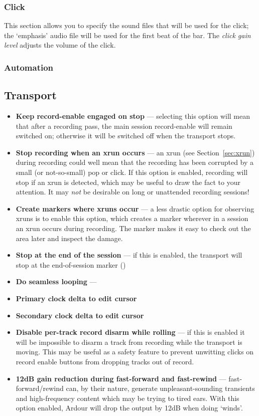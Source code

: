 \documentclass[10pt,a4paper]{book}
\newcommand{\todo}[1]{\marginpar{\small\texttt{#1}}}
\begin{document}
{\subsubsection{Click}

This section allows you to specify the sound files that will be used
for the click; the `emphasis' audio file will be used for the first
beat of the bar.  The \emph{click gain level} adjusts the volume of
the click.

\subsubsection{Automation}


\subsection{Transport}

\begin{itemize}
\item \textbf{Keep record-enable engaged on stop} --- selecting this
  option will mean that after a recording pass, the main session
  record-enable will remain switched on; otherwise it will be switched
  off when the transport stops.
\item \textbf{Stop recording when an xrun occurs} --- an xrun (see
  Section~\ref{sec:xrun}) during recording could well mean that the
  recording has been corrupted by a small (or not-so-small) pop or
  click.  If this option is enabled, recording will stop if an xrun is
  detected, which may be useful to draw the fact to your attention.
  It may \emph{not} be desirable on long or unattended recording
  sessions!
\item \textbf{Create markers where xruns occur} --- a less drastic
  option for observing xruns is to enable this option, which creates a
  marker wherever in a session an xrun occurs during recording.  The
  marker makes it easy to check out the area later and inspect the
  damage.
\item \textbf{Stop at the end of the session} --- if this is enabled,
  the transport will stop at the end-of-session marker (\todo{does it
    stop during record too?})
\item \textbf{Do seamless looping} --- \todo{hmm!}
\item \textbf{Primary clock delta to edit cursor}
\item \textbf{Secondary clock delta to edit cursor}
\item \textbf{Disable per-track record disarm while rolling} --- if
  this is enabled it will be impossible to disarm a track from
  recording while the transport is moving.  This may be useful as a
  safety feature to prevent unwitting clicks on record enable buttons
  from dropping tracks out of record.
\item \textbf{12dB gain reduction during fast-forward and fast-rewind}
  --- fast-forward/rewind can, by their nature, generate
  unpleasant-sounding transients and high-frequency content which may
  be trying to tired ears.  With this option enabled, Ardour will drop
  the output by 12dB when doing `winds'.
\end{itemize}

}
\end{document}
